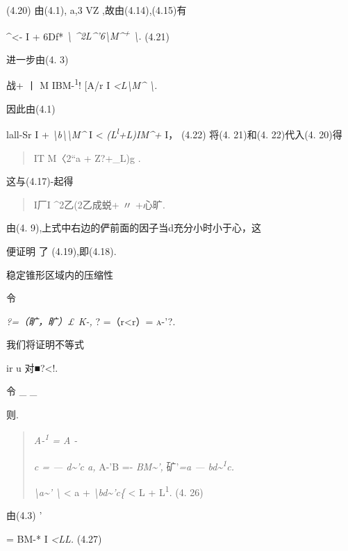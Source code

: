 \documentclass{article}
\begin{document}
(4.20) 由(4.1), \textbar{}a\textbar{},\textbar{}3\textbar{} VZ
,故由(4.14),(4.15)有

\textbar{}\^{}\textbar{}\textbar{}\textless{}- I +
\textbar{}6\textbar{}\textbar{}Df* \emph{\textbackslash{}
\^{}2L\^{}'6\textbackslash{}M\^{}\textsuperscript{+} \textbackslash{}.}
(4.21)

进一步由(4. 3)

\textbar{}战+ 丨 M IBM-\textsuperscript{1}! {[}A/r I
\emph{\textless{}L\textbackslash{}M\^{} \textbackslash{}.}

因此由(4.1)

lall-Sr I +
\emph{\textbackslash{}b\textbackslash{}\textbackslash{}M\^{}} I
\textless{} \emph{(L\textsuperscript{l}+L)IM\^{}+} I， (4.22) 将(4.
21)和(4. 22)代入(4. 20)得

\begin{quote}
IT \textbar{}M〈2``a + Z?+\_L)g \textbar{}.
\end{quote}

这与(4.17)-起得

\begin{quote}
I厂I \^{}2乙(2乙成蜕+ 〃 +心\textbar{}旷\textbar{}.
\end{quote}

由(4.
9),上式中右边的\textbar{}俨\textbar{}前面的因子当d充分小时小于心，这

便证明 了 (4.19),即(4.18).

稳定锥形区域内的压缩性

令

\emph{?=（旷，旷）£ K-,} ? =（r\textless{}r）= \textsc{a-'?.}

我们将证明不等式

ir u 对■?\textless{}!.

令 \_ \_

则.

\begin{quote}
\emph{A-\textsuperscript{1} = A -}

\emph{c = --- d\textasciitilde{}'c a,} A-'B =-
\emph{BM\textasciitilde{}',} 矿'\emph{=a ---
bd\textasciitilde{}\textsuperscript{1}c.}

\emph{\textbackslash{}a\textasciitilde{}' \textbackslash{}} \textless{}
\textbar{}a\textbar{} + \emph{\textbackslash{}bd\textasciitilde{}'c\{}
\textless{} L + L\textsuperscript{1}. (4. 26)
\end{quote}

由(4.3) '

= \textbar{}BM-* I \emph{\textless{}LL.} (4.27)
\end{document}
